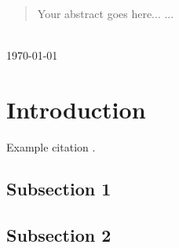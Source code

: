 \documentclass[12pt]{article} %
\begin{document}
\begin{titlepage}
\HRule \\[0.4cm]
\renewcommand{\abstractname}{RESUMEN DEL DOCUMENTO}
\begin{abstract}
Your abstract goes here...
...
\end{abstract}
\HRule \\[0.4cm]

{\large \today}\\[3cm] %


\vfill %

\end{titlepage}


\tableofcontents %

\newpage %


\section{Introduction} %

Example citation \cite{Figueredo:2009dg}.


\subsection{Subsection 1} %

\lipsum[1] %


\subsection{Subsection 2} %
\end{document}
